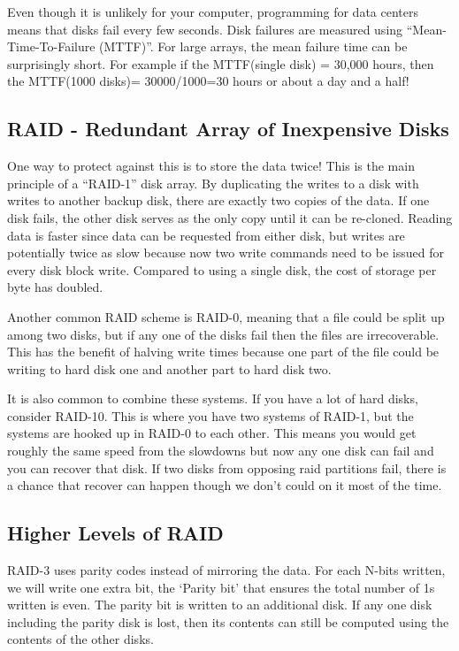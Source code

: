 Even though it is unlikely for your computer, programming for data centers means that disks fail every few seconds.
Disk failures are measured using ``Mean-Time-To-Failure (MTTF)''.
For large arrays, the mean failure time can be surprisingly short.
For example if the MTTF(single disk) = 30,000 hours, then the MTTF(1000 disks)= 30000/1000=30 hours or about a day and a half!

\subsection{RAID - Redundant Array of Inexpensive Disks}

One way to protect against this is to store the data twice! This is the main principle of a ``RAID-1'' disk array.
By duplicating the writes to a disk with writes to another backup disk, there are exactly two copies of the data.
If one disk fails, the other disk serves as the only copy until it can be re-cloned.
Reading data is faster since data can be requested from either disk, but writes are potentially twice as slow because now two write commands need to be issued for every disk block write.
Compared to using a single disk, the cost of storage per byte has doubled.

Another common RAID scheme is RAID-0, meaning that a file could be split up among two disks, but if any one of the disks fail then the files are irrecoverable.
This has the benefit of halving write times because one part of the file could be writing to hard disk one and another part to hard disk two.


It is also common to combine these systems.
If you have a lot of hard disks, consider RAID-10.
This is where you have two systems of RAID-1, but the systems are hooked up in RAID-0 to each other.
This means you would get roughly the same speed from the slowdowns but now any one disk can fail and you can recover that disk.
If two disks from opposing raid partitions fail, there is a chance that recover can happen though we don't could on it most of the time.

\subsection{Higher Levels of RAID}

RAID-3 uses parity codes instead of mirroring the data.
For each N-bits written, we will write one extra bit, the `Parity bit' that ensures the total number of 1s written is even.
The parity bit is written to an additional disk.
If any one disk including the parity disk is lost, then its contents can still be computed using the contents of the other disks.

